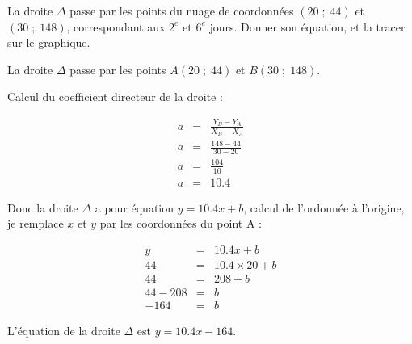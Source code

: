 \begin{questions}
	\question 
	
	\question[2] La droite $\Delta$ passe par les points du nuage de coordonnées $(20\; ; \;44)$ et $(30\; ; \;148)$, correspondant aux $2^e$ et $6^e$ jours. Donner son équation, et la tracer sur le graphique.
	\begin{solution}
		La droite $\Delta$ passe par les points $A(20\; ; \;44)$ et $B(30\; ; \;148)$.
		
		Calcul du coefficient directeur de la droite :
		
		\begin{eqnarray*}
			a &=& \frac{Y_B - Y_A}{X_B-X_A} \\
			a &=& \frac{148 - 44}{30 - 20} \\
			a &=& \frac{104}{10} \\
			a &=& \num{10.4}
		\end{eqnarray*}
		
		Donc la droite $\Delta$ a pour équation $y= \num{10.4} x + b$, calcul de l'ordonnée à l'origine, je remplace $x$ et $y$ par les coordonnées du point A :
		
		\begin{eqnarray*}
			y &=& \num{10.4} x + b \\
			44 &=& \num{10.4} \times 20 + b \\
			44 &=& 208 + b \\
			44 - 208 &=& b \\
			-164 &=& b
 		\end{eqnarray*}
 	
 		L'équation de la droite $\Delta$ est $y=\num{10.4} x - 164$.
	\end{solution}
	

\end{questions}
